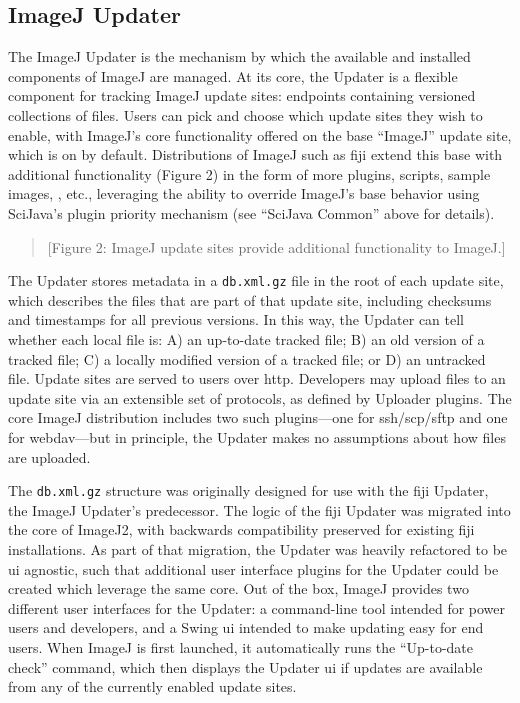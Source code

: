 \documentclass{bmcart}
\begin{document}
\subsection*{ImageJ Updater}
The ImageJ Updater is the mechanism by which the available and installed
components of ImageJ are managed. At its core, the Updater is a flexible
component for tracking ImageJ update sites: endpoints containing versioned
collections of files. Users can pick and choose which update sites they wish to
enable, with ImageJ's core functionality offered on the base ``ImageJ'' update
site, which is on by default. Distributions of ImageJ such as \acrfull{fiji}
\cite{fiji} extend this base with additional functionality (Figure 2) in the
form of more plugins, scripts, sample images, , etc., leveraging
the ability to override ImageJ's base behavior using SciJava's plugin priority
mechanism (see ``SciJava Common'' above for details).

\begin{quote}
[Figure 2: ImageJ update sites provide additional functionality to ImageJ.]
\end{quote}

The Updater stores metadata in a \texttt{db.xml.gz} file in the root of each
update site, which describes the files that are part of that update site,
including checksums and timestamps for all previous versions. In this way, the
Updater can tell whether each local file is: A) an up-to-date tracked file; B)
an old version of a tracked file; C) a locally modified version of a tracked
file; or D) an untracked file. Update sites are served to users over
\acrshort{http}. Developers may upload files to an update site via an
extensible set of protocols, as defined by Uploader plugins. The core ImageJ
distribution includes two such plugins---one for
\acrshort{ssh}/\acrshort{scp}/\acrshort{sftp} and one for
\acrshort{webdav}---but in principle, the Updater makes no assumptions about
how files are uploaded.

The \texttt{db.xml.gz} structure was originally designed for use with the
\acrshort{fiji} Updater, the ImageJ Updater's predecessor. The logic of the
\acrshort{fiji} Updater was migrated into the core of ImageJ2, with backwards
compatibility preserved for existing \acrshort{fiji} installations. As part of
that migration, the Updater was heavily refactored to be \acrshort{ui}
agnostic, such that additional user interface plugins for the Updater could be
created which leverage the same core. Out of the box, ImageJ provides two
different user interfaces for the Updater: a command-line tool intended for
power users and developers, and a Swing \acrshort{ui} intended to make updating
easy for end users. When ImageJ is first launched, it automatically runs the
``Up-to-date check'' command, which then displays the Updater \acrshort{ui} if
updates are available from any of the currently enabled update sites.
\end{document}
